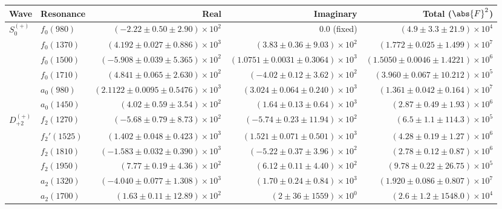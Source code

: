 \begin{table}[ht]
    \begin{center}
        \begin{tabular}{llrrr}\toprule
        Wave & Resonance & Real & Imaginary & Total ($\abs{F}^2$) \\\midrule
$S_{0}^{(+)}$ & $f_{0}(980)$ & $(-2.22 \pm 0.50 \pm 2.90) \times 10^{2}$ & $0.0$ (fixed) & $(4.9 \pm 3.3 \pm 21.9) \times 10^{4}$ \\
 & $f_{0}(1370)$ & $(4.192 \pm 0.027 \pm 0.886) \times 10^{3}$ & $(3.83 \pm 0.36 \pm 9.03) \times 10^{2}$ & $(1.772 \pm 0.025 \pm 1.499) \times 10^{7}$ \\
 & $f_{0}(1500)$ & $(-5.908 \pm 0.039 \pm 5.365) \times 10^{2}$ & $(1.0751 \pm 0.0031 \pm 0.3064) \times 10^{3}$ & $(1.5050 \pm 0.0046 \pm 1.4221) \times 10^{6}$ \\
 & $f_{0}(1710)$ & $(4.841 \pm 0.065 \pm 2.630) \times 10^{2}$ & $(-4.02 \pm 0.12 \pm 3.62) \times 10^{2}$ & $(3.960 \pm 0.067 \pm 10.212) \times 10^{5}$ \\
 & $a_{0}(980)$ & $(2.1122 \pm 0.0095 \pm 0.5476) \times 10^{3}$ & $(3.024 \pm 0.064 \pm 0.240) \times 10^{3}$ & $(1.361 \pm 0.042 \pm 0.164) \times 10^{7}$ \\
 & $a_{0}(1450)$ & $(4.02 \pm 0.59 \pm 3.54) \times 10^{2}$ & $(1.64 \pm 0.13 \pm 0.64) \times 10^{3}$ & $(2.87 \pm 0.49 \pm 1.93) \times 10^{6}$ \\
$D_{+2}^{(+)}$ & $f_{2}(1270)$ & $(-5.68 \pm 0.79 \pm 8.73) \times 10^{2}$ & $(-5.74 \pm 0.23 \pm 11.94) \times 10^{2}$ & $(6.5 \pm 1.1 \pm 114.3) \times 10^{5}$ \\
 & $f_{2}'(1525)$ & $(1.402 \pm 0.048 \pm 0.423) \times 10^{3}$ & $(1.521 \pm 0.071 \pm 0.501) \times 10^{3}$ & $(4.28 \pm 0.19 \pm 1.27) \times 10^{6}$ \\
 & $f_{2}(1810)$ & $(-1.583 \pm 0.032 \pm 0.390) \times 10^{3}$ & $(-5.22 \pm 0.37 \pm 3.96) \times 10^{2}$ & $(2.78 \pm 0.12 \pm 0.87) \times 10^{6}$ \\
 & $f_{2}(1950)$ & $(7.77 \pm 0.19 \pm 4.36) \times 10^{2}$ & $(6.12 \pm 0.11 \pm 4.40) \times 10^{2}$ & $(9.78 \pm 0.22 \pm 26.75) \times 10^{5}$ \\
 & $a_{2}(1320)$ & $(-4.040 \pm 0.077 \pm 1.308) \times 10^{3}$ & $(1.70 \pm 0.24 \pm 0.84) \times 10^{3}$ & $(1.920 \pm 0.086 \pm 0.807) \times 10^{7}$ \\
 & $a_{2}(1700)$ & $(1.63 \pm 0.11 \pm 12.89) \times 10^{2}$ & $(2 \pm 36 \pm 1559) \times 10^{0}$ & $(2.6 \pm 1.2 \pm 1548.0) \times 10^{4}$ \\

\end{tabular}
\end{center}
\end{table}
